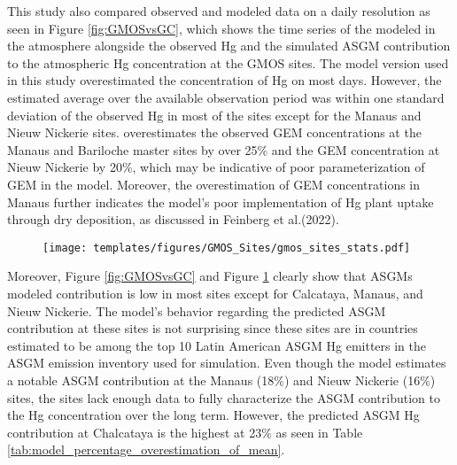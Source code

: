 \begin{flushleft}


 This study also compared observed and modeled data on a daily resolution as seen in Figure \ref{fig:GMOSvsGC}, which shows the time series of the modeled \hgc in the atmosphere alongside the observed Hg and the simulated ASGM contribution to the atmospheric Hg concentration at the GMOS sites. The \gc model version used in this study overestimated the concentration of Hg on most days. However, the \gc estimated average \hgc over the available observation period was within one standard deviation of the observed Hg in most of the sites except for the Manaus and Nieuw Nickerie sites. \gcs overestimates the observed GEM concentrations at the Manaus and Bariloche master sites by over 25\%  and the GEM concentration at Nieuw Nickerie by 20\%, which may be indicative of poor parameterization of GEM in the model. Moreover, the overestimation of GEM concentrations in Manaus further indicates the model's poor implementation of Hg plant uptake through dry deposition, as discussed in Feinberg et al.(2022)\cite{feinberg_evaluating_2022}.
\end{flushleft}


\begin{figure}[H]
\texttt{[image: templates/figures/GMOS\_Sites/gmos\_sites\_stats.pdf]}
\centering
{}
\label{fig:gmos_sites_stats}
\end{figure}
\FloatBarrier
\begin{flushleft}
Moreover, Figure \ref{fig:GMOSvsGC} and Figure \ref{fig:gmos_sites_stats} clearly show that ASGMs modeled contribution is low in most sites except for Calcataya, Manaus, and Nieuw Nickerie. The model's behavior regarding the predicted ASGM contribution at these sites is not surprising since these sites are in countries estimated to be among the top 10 Latin American ASGM Hg emitters in the ASGM emission inventory used for \gc simulation. Even though the model estimates a notable ASGM contribution at the Manaus (18\%) and Nieuw Nickerie (16\%) sites, the sites lack enough data to fully characterize the ASGM contribution to the Hg concentration over the long term. However, the predicted  ASGM Hg contribution at Chalcataya is the highest at 23\% as seen in Table \ref{tab:model_percentage_overestimation_of_mean}. 
\end{flushleft}


